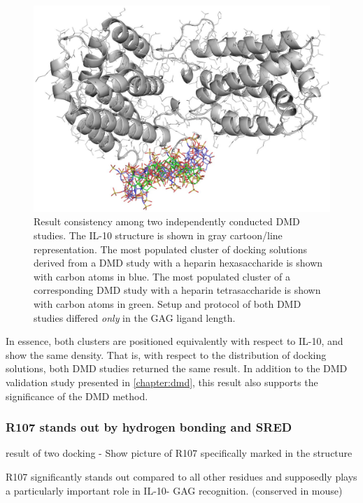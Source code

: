 \begin{figure}
\centering
\includegraphics[width=1.0\textwidth]{gfx/dmdil10/hp_hexa_vs_tetra_clusters_position_match_cropped.jpg}
\caption[]{Result consistency among two independently conducted DMD studies. The
IL-10 structure is shown in gray cartoon/line representation. The most populated
cluster of docking solutions derived from a DMD study with a heparin
hexasaccharide is shown with carbon atoms in blue. The most populated cluster of
a corresponding DMD study with a heparin tetrasaccharide is shown with carbon
atoms in green. Setup and protocol of both DMD studies differed \textit{only} in
the GAG ligand length.}
\label{fig:dmdil10:hp_hexa_vs_tetra_clusters_position_match}
\end{figure}

In essence, both clusters are positioned equivalently with respect to IL-10, and
show the same density. That is, with respect to the distribution of docking
solutions, both DMD studies returned the same result. In addition to the DMD
validation study presented in \cref{chapter:dmd}, this result also supports the
significance of the DMD method.

\subsubsection{R107 stands out by hydrogen bonding and SRED}



result of two docking
- Show picture of R107 specifically marked in the structure


R107 significantly stands out compared to all other residues
and supposedly plays a particularly important role in IL-10-
GAG recognition.
(conserved in mouse)

